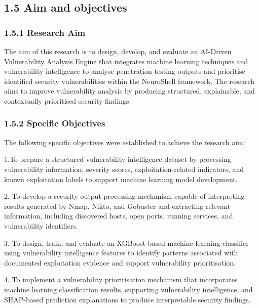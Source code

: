 \documentclass[
]{article}
\begin{document}
\hypertarget{section}{%
\subsection{}\label{section}}

\hypertarget{aim-and-objectives}{%
\subsection{1.5 Aim and objectives}\label{aim-and-objectives}}

\hypertarget{research-aim}{%
\subsubsection{1.5.1 Research Aim}\label{research-aim}}

The aim of this research is to design, develop, and evaluate an
AI-Driven Vulnerability Analysis Engine that integrates machine learning
techniques and vulnerability intelligence to analyse penetration testing
outputs and prioritise identified security vulnerabilities within the
NeuroShell framework. The research aims to improve vulnerability
analysis by producing structured, explainable, and contextually
prioritised security findings.

\hypertarget{specific-objectives}{%
\subsubsection{1.5.2 Specific Objectives}\label{specific-objectives}}

The following specific objectives were established to achieve the
research aim:

1.To prepare a structured vulnerability intelligence dataset by
processing vulnerability information, severity scores,
exploitation-related indicators, and known exploitation labels to
support machine learning model development.

2. To develop a security output processing mechanism capable of
interpreting results generated by Nmap, Nikto, and Gobuster and
extracting relevant information, including discovered hosts, open ports,
running services, and vulnerability identifiers.

3. To design, train, and evaluate an XGBoost-based machine learning
classifier using vulnerability intelligence features to identify
patterns associated with documented exploitation evidence and support
vulnerability prioritisation.

4. To implement a vulnerability prioritisation mechanism that
incorporates machine learning classification results, supporting
vulnerability intelligence, and SHAP-based prediction explanations to
produce interpretable security findings.
\end{document}
